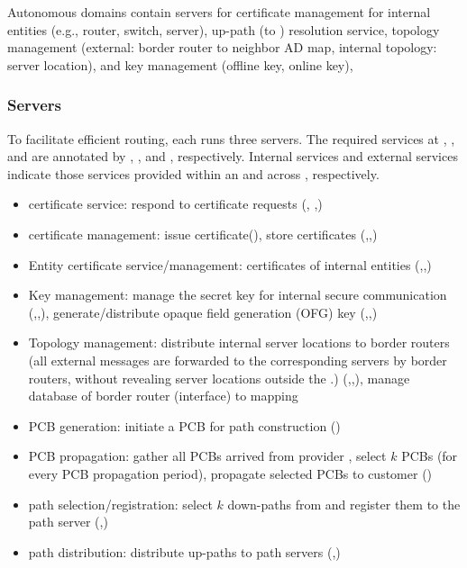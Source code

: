  Autonomous domains contain servers for certificate management for internal entities (e.g., router, switch, server), up-path (to \TDC) resolution service, topology management (external: border router to neighbor AD map, internal topology: server location), and key management (offline key, online key), 

\subsubsection{Servers}
To facilitate efficient routing, each \AD runs three servers. The required services at \TDC \AD, \TRAN \AD, and \STUB \AD are annotated by \CAD, \TAD, and \EAD, respectively. Internal services and external services indicate those services provided within an \AD and across \ADs, respectively.

\begin{itemize}
\item \AD certificate service: respond to certificate requests (\CAD, \TAD,\EAD) 
\item \AD certificate management: issue certificate(\CAD), store certificates (\CAD,\TAD,\EAD)
\item Entity certificate service/management: certificates of internal entities (\CAD,\TAD,\EAD)  
\item Key management: manage the secret key for internal secure communication (\CAD,\TAD,\EAD), generate/distribute opaque field generation (OFG) key (\CAD,\TAD,\EAD) 
\item Topology management: distribute internal server locations to border routers (all external messages are forwarded to the corresponding servers by border routers, without revealing server locations outside the \AD.) (\CAD,\TAD,\EAD), manage database of border router (interface) to \AD mapping
\end{itemize}

\begin{itemize}
\item PCB generation: initiate a PCB for path construction (\CAD)
\item PCB propagation: gather all PCBs arrived from provider \ADs, select $k$ PCBs (for every PCB propagation period), propagate selected PCBs to customer \ADs (\TAD)
\item path selection/registration: select $k$ down-paths from \TDC and register them to the \TDC path server (\TAD,\EAD)
\item path distribution: distribute up-paths to path servers (\TAD,\EAD) 
\end{itemize}

